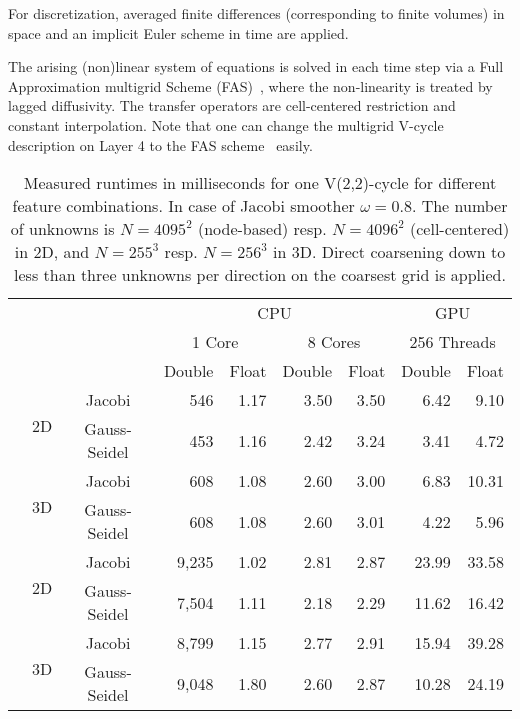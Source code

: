 \documentclass[onecolumn]{svjour3}
\newcommand{\examultirow}[2]{\multirow{#1}{*}{\rotatebox[origin=c]{90}{\centering #2}}}
\begin{document}
For discretization, averaged finite differences (corresponding to finite volumes) in space and an implicit Euler scheme in time are applied. 

The arising (non)linear system of equations is solved in each time step via a Full Approximation multigrid Scheme (FAS)~\cite{Trottenbergoosterlee01}, where the non-linearity is treated by lagged diffusivity. The transfer operators are cell-centered restriction and constant interpolation.
Note that one can change the multigrid V-cycle description on Layer 4 to the FAS scheme~\cite{Dietrich:2010:AWSEC10} easily.





\begin{table}
\begin{center}

\begin{tabular}{ccc rrrrrr}
    \toprule
&&& \multicolumn{4}{c}{CPU} & \multicolumn{2}{c}{GPU}\\
\cmidrule{4-9}
&&& \multicolumn{2}{c}{1 Core} & \multicolumn{2}{c}{8 Cores} & \multicolumn{2}{c}{256 Threads}\\
\cmidrule{4-9}
&&& Double & Float & Double & Float & Double & Float\\
\midrule
\examultirow{5}{Laplacian} & \multirow{2}{*}{2D} &  Jacobi &         546   & 1.17 & 3.50 & 3.50 & 6.42  & 9.10\\
\cmidrule{3-9}
& &                                             Gauss-Seidel &       453   & 1.16 & 2.42 & 3.24 & 3.41  & 4.72\\
\cmidrule{2-9}
& \multirow{2}{*}{3D} &                             Jacobi &         608   & 1.08 & 2.60 & 3.00 & 6.83  & 10.31\\
\cmidrule{3-9}
& &                                         Gauss-Seidel &           608   & 1.08 & 2.60 & 3.01 & 4.22  & 5.96\\
\midrule
\examultirow{5}{Complex Diff.} & \multirow{2}{*}{2D} & Jacobi &      9,235 & 1.02 & 2.81 & 2.87 & 23.99 & 33.58\\
\cmidrule{3-9}
&&                                          Gauss-Seidel &           7,504 & 1.11 & 2.18 & 2.29 & 11.62 & 16.42\\
\cmidrule{2-9}
& \multirow{2}{*}{3D} &                         Jacobi &             8,799 & 1.15 & 2.77 & 2.91 & 15.94 & 39.28\\
\cmidrule{3-9}
&&                                          Gauss-Seidel &           9,048 & 1.80 & 2.60 & 2.87 & 10.28 & 24.19\\
\bottomrule
\end{tabular}

\caption[Partitioning of a cell-centered grid into four sub-grids]{\label{tab:generatorresults}Measured runtimes in milliseconds for one V(2,2)-cycle for different feature combinations. In case of Jacobi smoother $\omega=0.8$. The number of unknowns is $N = 4095^2$ (node-based) resp. $N = 4096^2$ (cell-centered) in 2D, and $N = 255^3$ resp. $N = 256^3$ in 3D. Direct coarsening down to less than three unknowns per direction on the coarsest grid is applied.}
\end{center}
\end{table}
 
\end{document}
